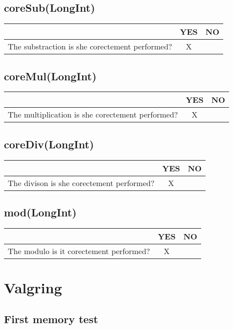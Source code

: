 \documentclass[11pt]{report}
\begin{document}
    \section{coreSub(LongInt)}

\begin{tabular}{|l|c|c|}
  \hline
   & YES & NO \\
  \hline
 The substraction is she corectement performed? & X &  \\
  \hline
\end{tabular}

    \section{coreMul(LongInt)}
  
\begin{tabular}{|l|c|c|}
 \hline
   & YES & NO \\
  \hline
 The multiplication is she corectement performed? & X &  \\
  \hline
\end{tabular}

    \section{coreDiv(LongInt)}

\begin{tabular}{|l|c|c|}
 \hline
   & YES & NO \\
  \hline
 The divison is she corectement performed? & X &  \\
  \hline
\end{tabular}

 \section{mod(LongInt)}

\begin{tabular}{|l|c|c|}
 \hline
   & YES & NO \\
  \hline
 The modulo is it corectement performed? & X &  \\
  \hline
\end{tabular}

\chapter*{Valgring}
\section{First memory test}
\end{document}
